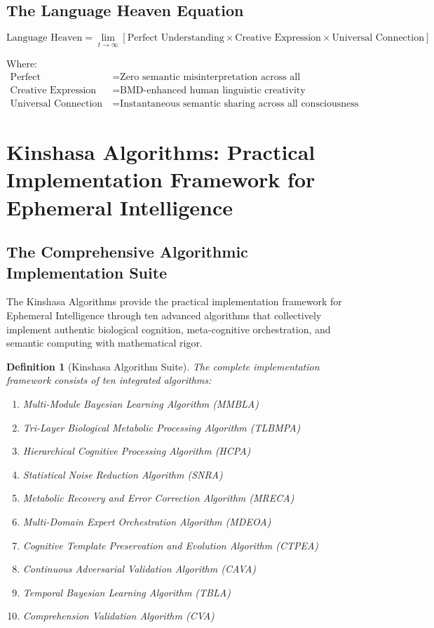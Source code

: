 \documentclass[12pt,a4paper]{article}
\newtheorem{definition}{Definition}
\begin{document}
\subsection{The Language Heaven Equation}

\begin{equation}
\text{Language Heaven} = \lim_{t \rightarrow \infty} [\text{Perfect Understanding} \times \text{Creative Expression} \times \text{Universal Connection}]
\end{equation}

Where:
\begin{align}
\text{Perfect Understanding} &= \text{Zero semantic misinterpretation across all communication} \\
\text{Creative Expression} &= \text{BMD-enhanced human linguistic creativity} \\
\text{Universal Connection} &= \text{Instantaneous semantic sharing across all consciousness}
\end{align}

\section{Kinshasa Algorithms: Practical Implementation Framework for Ephemeral Intelligence}

\subsection{The Comprehensive Algorithmic Implementation Suite}

The Kinshasa Algorithms provide the practical implementation framework for Ephemeral Intelligence through ten advanced algorithms that collectively implement authentic biological cognition, meta-cognitive orchestration, and semantic computing with mathematical rigor.

\begin{definition}[Kinshasa Algorithm Suite]
The complete implementation framework consists of ten integrated algorithms:
\begin{enumerate}
\item Multi-Module Bayesian Learning Algorithm (MMBLA)
\item Tri-Layer Biological Metabolic Processing Algorithm (TLBMPA)
\item Hierarchical Cognitive Processing Algorithm (HCPA)
\item Statistical Noise Reduction Algorithm (SNRA)
\item Metabolic Recovery and Error Correction Algorithm (MRECA)
\item Multi-Domain Expert Orchestration Algorithm (MDEOA)
\item Cognitive Template Preservation and Evolution Algorithm (CTPEA)
\item Continuous Adversarial Validation Algorithm (CAVA)
\item Temporal Bayesian Learning Algorithm (TBLA)
\item Comprehension Validation Algorithm (CVA)
\end{enumerate}
\end{definition}
\end{document}
